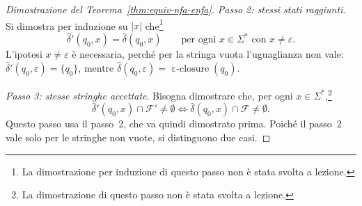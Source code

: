 \documentclass[a4paper, 11pt, oneside]{book}
\theoremstyle{formale}
\DeclareMathOperator{\eclosure}{\varepsilon\text{-}closure}
\begin{document}
\begin{proof}[Dimostrazione del Teorema~\ref{thm:equiv-nfa-enfa}]
        \emph{Passo 2: stessi stati raggiunti}. Si dimostra per induzione su $|x|$
        che\footnote{La dimostrazione per induzione di questo passo non \`e stata svolta a
        lezione.}
        \begin{equation*}
            \hat{\delta}'(q_0, x) = \hat{\delta}(q_0, x)
            \qquad \text{per ogni } x \in \Sigma^* \text{ con } x \neq \varepsilon.
        \end{equation*}
        L'ipotesi $x \neq \varepsilon$ \`e necessaria, perch\'e per la stringa vuota
        l'uguaglianza non vale: $\hat{\delta}'(q_0, \varepsilon) = \{q_0\}$, mentre
        $\hat{\delta}(q_0, \varepsilon) = \eclosure(q_0)$.

        \emph{Passo 3: stesse stringhe accettate}. Bisogna dimostrare che, per ogni
        $x \in \Sigma^*$,\footnote{La dimostrazione di questo passo non \`e stata svolta
        a lezione.}
        \begin{equation*}
            \hat{\delta}'(q_0, x) \cap \mathcal{F}' \neq \emptyset \iff
            \hat{\delta}(q_0, x) \cap \mathcal{F} \neq \emptyset.
        \end{equation*}
        Questo passo usa il passo~2, che va quindi dimostrato prima. Poich\'e il passo~2
        vale solo per le stringhe non vuote, si distinguono due casi.


\end{proof}
\end{document}
